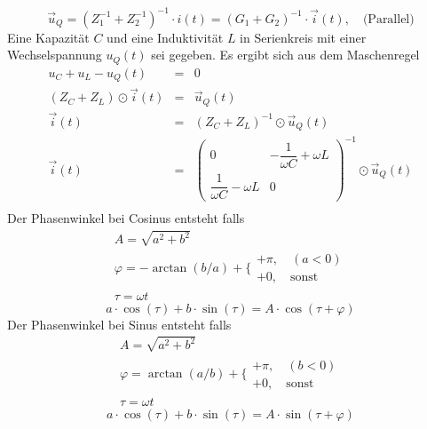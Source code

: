 \begin{equation}
\boxed{\overrightarrow{u}_Q=\left(Z_1^{-1}+Z_2^{-1}\right)^{-1}\cdot i(t)=\left(G_1+G_2\right)^{-1}\cdot \overrightarrow{i}(t),\quad \text{(Parallel)}}
\end{equation}
Eine Kapazität $C$ und eine Induktivität $L$ in Serienkreis mit einer Wechselspannung $u_Q(t)$ sei gegeben. Es ergibt sich aus dem Maschenregel
\begin{equation*}
\begin{array}{lll}
u_C+u_L-u_Q(t)&=&0\\
\left(Z_C+Z_L\right)\odot \overrightarrow{i}(t)&=&\overrightarrow{u}_Q(t)\\
\overrightarrow{i}(t)&=&\left(Z_C+Z_L\right)^{-1}\odot \overrightarrow{u}_Q(t)\\
\overrightarrow{i}(t)&=&\begin{pmatrix}0&-\dfrac{1}{\omega C}+\omega L\\\dfrac{1}{\omega C}-\omega L&0\end{pmatrix}^{-1}\odot \overrightarrow{u}_Q(t)\\
\end{array}
\end{equation*}
Der Phasenwinkel bei Cosinus entsteht falls
\begin{equation}
\boxed{
\begin{array}{l}
A=\sqrt{a^2+b^2}\\
\varphi=-\arctan\left(b/a\right)+\Big\{\begin{matrix}+\pi,\quad (a<0)\\+0,\quad \text{sonst}\end{matrix}\\
\tau=\omega t
\end{array}
}
\end{equation}
\begin{equation}
\boxed{a\cdot \cos\left(\tau\right)+b\cdot \sin\left(\tau\right)=A\cdot \cos\left(\tau+\varphi\right)}
\end{equation}
Der Phasenwinkel bei Sinus entsteht falls
\begin{equation}
\boxed{
\begin{array}{l}
A=\sqrt{a^2+b^2}\\
\varphi=\arctan\left(a/b\right)+\Big\{\begin{matrix}+\pi,\quad (b<0)\\+0,\quad \text{sonst}\end{matrix}\\
\tau=\omega t
\end{array}
}
\end{equation}
\begin{equation}
\boxed{a\cdot \cos\left(\tau\right)+b\cdot \sin\left(\tau\right)=A\cdot \sin\left(\tau+\varphi\right)}
\end{equation}
